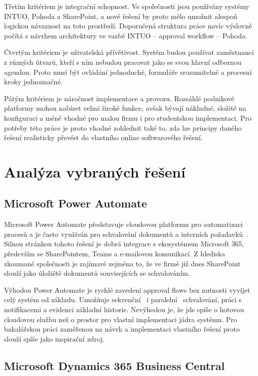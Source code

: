 Třetím kritériem je integrační schopnost. Ve společnosti jsou používány systémy INTUO, Pohoda a SharePoint, a nové řešení by proto mělo umožnit alespoň logickou návaznost na toto prostředí. Doporučená struktura práce navíc výslovně počítá s návrhem architektury ve vazbě INTUO -- approval workflow -- Pohoda.

Čtvrtým kritériem je uživatelská přívětivost. Systém budou používat zaměstnanci z různých útvarů, kteří s ním nebudou pracovat jako se svou hlavní odbornou agendou. Proto musí být ovládání jednoduché, formuláře srozumitelné a procesní kroky jednoznačné.

Pátým kritériem je náročnost implementace a provozu. Rozsáhlé podnikové platformy mohou nabízet velmi široké funkce, avšak bývají nákladné, složité na konfiguraci a méně vhodné pro malou firmu i pro studentskou implementaci. Pro potřeby této práce je proto vhodné zohlednit také to, zda lze principy daného řešení realisticky převést do vlastního online softwarového řešení.


\section{Analýza vybraných řešení}


\subsection{Microsoft Power Automate}

Microsoft Power Automate představuje cloudovou platformu pro automatizaci procesů a je často využíván pro schvalování dokumentů a interních požadavků~\cite{ref7}. Silnou stránkou tohoto řešení je dobrá integrace s ekosystémem Microsoft 365, především se SharePointem, Teams a e-mailovou komunikací. Z hlediska zkoumané společnosti je zajímavé zejména to, že ve firmě již dnes SharePoint slouží jako úložiště dokumentů souvisejících se schvalováním.

Výhodou Power Automate je rychlé zavedení approval flows bez nutnosti vyvíjet celý systém od základu. Umožňuje sekvenční~\cite{ref8} i paralelní~\cite{ref9} schvalování, práci s notifikacemi a evidenci základní historie. Nevýhodou je, že jde spíše o hotovou cloudovou službu než o prostor pro vlastní implementaci jádra systému. Pro bakalářskou práci zaměřenou na návrh a implementaci vlastního řešení proto slouží spíše jako inspirační zdroj.


\subsection{Microsoft Dynamics 365 Business Central}

